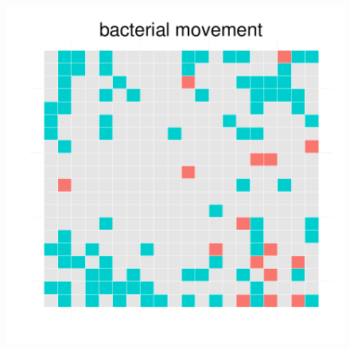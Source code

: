 \begin{figure}[h!]
{\begin{minipage}[t]{0.3\textwidth}
  \end{minipage}
  \begin{minipage}[t]{0.3\textwidth}
    \includegraphics[width=\textwidth]{../results/img/ecoli_beijerinckii_20x20_seed5147_bac65.pdf}
  \end{minipage}
  }
\end{figure}
